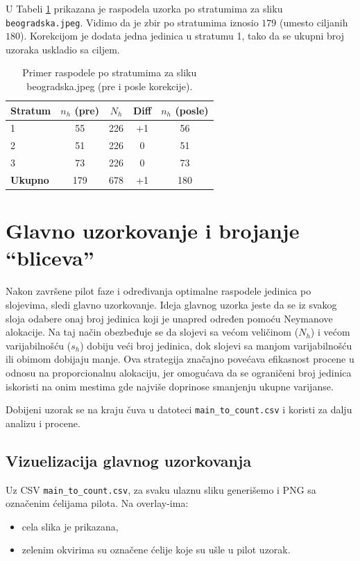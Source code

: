 \documentclass[a4paper,12pt]{article}
\begin{document}
\noindent
U Tabeli \ref{tab:alloc-beogradska} prikazana je raspodela uzorka po stratumima za sliku \texttt{beogradska.jpeg}.  
Vidimo da je zbir po stratumima iznosio $179$ (umesto ciljanih $180$).  
Korekcijom je dodata jedna jedinica u stratumu 1, tako da se ukupni broj uzoraka uskladio sa ciljem.

\begin{table}[H]
\centering
\begin{tabular}{lcccc}
\hline
Stratum & $n_h$ (pre) & $N_h$ & Diff & $n_h$ (posle) \\
\hline
1 & 55 & 226 & +1 & 56 \\
2 & 51 & 226 & 0  & 51 \\
3 & 73 & 226 & 0  & 73 \\
\hline
\textbf{Ukupno} & 179 & 678 & +1 & 180 \\
\hline
\end{tabular}
\caption{Primer raspodele po stratumima za sliku beogradska.jpeg (pre i posle korekcije).}
\label{tab:alloc-beogradska}
\end{table}

\section{Glavno uzorkovanje i brojanje “bliceva”}

Nakon završene pilot faze i određivanja optimalne raspodele jedinica po slojevima, 
sledi glavno uzorkovanje. Ideja glavnog uzorka jeste da se iz svakog sloja odabere 
onaj broj jedinica koji je unapred određen pomoću Neymanove alokacije. 
Na taj način obezbeđuje se da slojevi sa većom veličinom ($N_h$) i većom varijabilnošću ($s_h$) 
dobiju veći broj jedinica, dok slojevi sa manjom varijabilnošću ili obimom dobijaju manje. 
Ova strategija značajno povećava efikasnost procene u odnosu na proporcionalnu alokaciju, 
jer omogućava da se ograničeni broj jedinica iskoristi na onim mestima gde najviše doprinose 
smanjenju ukupne varijanse.

Dobijeni uzorak se na kraju čuva u datoteci 
\texttt{main\_to\_count.csv} i koristi za dalju analizu i procene.

\subsection{Vizuelizacija glavnog uzorkovanja}

Uz CSV \texttt{main\_to\_count.csv}, za svaku ulaznu sliku generišemo i PNG sa označenim ćelijama pilota. Na overlay-ima:
\begin{itemize}
	\item cela slika je prikazana,
	\item zelenim okvirima su označene ćelije koje su ušle u pilot uzorak.
\end{itemize}
\end{document}

